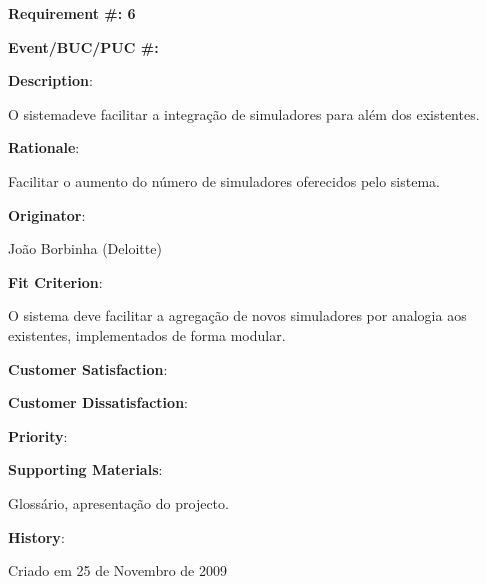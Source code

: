 \pagebreak

\begin{minipage}{0.55\textwidth}
\begin{flushleft}\textbf{Requirement \#: 6}\end{flushleft}
\end{minipage}
\begin{minipage}{0.4\textwidth}
\begin{flushright}\textbf{Event/BUC/PUC \#:}\end{flushright}
\end{minipage}

\begin{description}
\item \textbf{Description}:

O sistemadeve facilitar a integração de simuladores para além dos existentes.\\

\item \textbf{Rationale}:

Facilitar o aumento do número de simuladores oferecidos pelo sistema.\\

\item \textbf{Originator}:

João Borbinha (Deloitte)\\

\item \textbf{Fit Criterion}:

O sistema deve facilitar a agregação de novos simuladores por analogia aos existentes, implementados de forma modular.\\

\begin{minipage}{0.45\textwidth}
\begin{flushleft}\item \textbf{Customer Satisfaction}:\end{flushleft}
\end{minipage}
\begin{minipage}{0.45\textwidth}
\begin{flushleft}\item \textbf{Customer Dissatisfaction}:\end{flushleft}
\end{minipage}

\item \textbf{Priority}:\\

\item \textbf{Supporting Materials}:

Glossário, apresentação do projecto.\\

\item \textbf{History}:

Criado em 25 de Novembro de 2009\\
\end{description}

